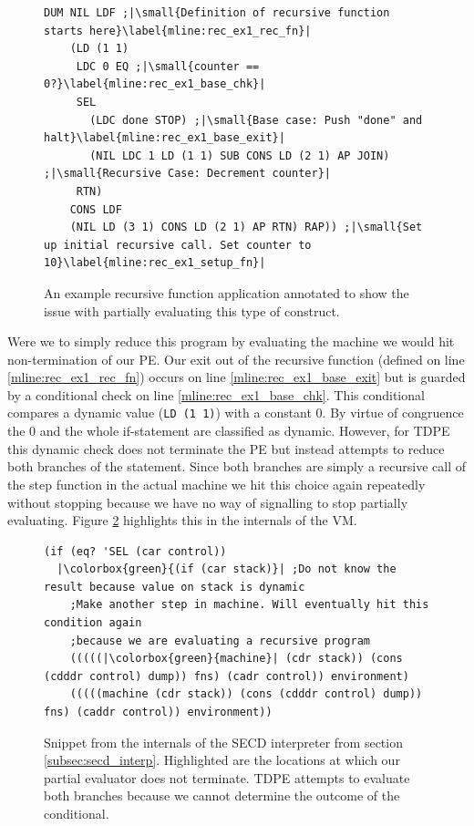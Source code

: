 \documentclass{article}
\theoremstyle{definition}
\begin{document}
\begin{figure}[ht]
\begin{verbatim}
DUM NIL LDF ;|\small{Definition of recursive function starts here}\label{mline:rec_ex1_rec_fn}|
    (LD (1 1)
     LDC 0 EQ ;|\small{counter == 0?}\label{mline:rec_ex1_base_chk}|
     SEL
       (LDC done STOP) ;|\small{Base case: Push "done" and halt}\label{mline:rec_ex1_base_exit}|
       (NIL LDC 1 LD (1 1) SUB CONS LD (2 1) AP JOIN) ;|\small{Recursive Case: Decrement counter}|
     RTN)
    CONS LDF
    (NIL LD (3 1) CONS LD (2 1) AP RTN) RAP)) ;|\small{Set up initial recursive call. Set counter to 10}\label{mline:rec_ex1_setup_fn}|
\end{verbatim}
\caption{An example recursive function application annotated to show the issue with partially evaluating this type of construct.}
\label{lst:secd_recursion_ex1}
\end{figure}

Were we to simply reduce this program by evaluating the machine we would hit non-termination of our PE. Our exit out of the recursive function (defined on line \ref{mline:rec_ex1_rec_fn}) occurs on line \ref{mline:rec_ex1_base_exit} but is guarded by a conditional check on line \ref{mline:rec_ex1_base_chk}. This conditional compares a dynamic value (\texttt{LD (1 1)}) with a constant 0. By virtue of congruence the 0 and the whole if-statement are classified as dynamic. However, for TDPE this dynamic check does not terminate the PE but instead attempts to reduce both branches of the statement. Since both branches are simply a recursive call of the step function in the actual machine we hit this choice again repeatedly without stopping because we have no way of signalling to stop partially evaluating. Figure \ref{lst:secd_recursion_machine_ex1} highlights this in the internals of the VM.

\begin{figure}[ht!]
\begin{verbatim}
(if (eq? 'SEL (car control))
  |\colorbox{green}{(if (car stack)}| ;Do not know the result because value on stack is dynamic
    ;Make another step in machine. Will eventually hit this condition again
    ;because we are evaluating a recursive program
    (((((|\colorbox{green}{machine}| (cdr stack)) (cons (cdddr control) dump)) fns) (cadr control)) environment)
    (((((machine (cdr stack)) (cons (cdddr control) dump)) fns) (caddr control)) environment))
\end{verbatim}
\caption{Snippet from the internals of the SECD interpreter from section \ref{subsec:secd_interp}. Highlighted are the locations at which our partial evaluator does not terminate. TDPE attempts to evaluate both branches because we cannot determine the outcome of the conditional.}
\label{lst:secd_recursion_machine_ex1}
\end{figure}
\end{document}
